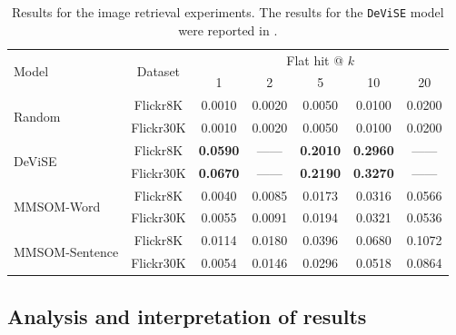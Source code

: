 \documentclass[a4paper]{standalone}
\begin{document}
\begin{table}[h]
    \begin{footnotesize}
        \begin{tabularx}{\textwidth}{|X|c|c|c|c|c|c|}
            \hline
            \multirow{2}{*}{Model}          & \multirow{2}{*}{Dataset} & \multicolumn{5}{c|}{Flat hit @ $k$} \\
            \cline{3-7}                     &                          & 1      & 2      & 5      & 10     & 20     \\ 
            \hline
            \multirow{2}{*}{Random}         & Flickr8K                  & 0.0010 & 0.0020 & 0.0050 & 0.0100 & 0.0200 \\ 
            \cline{2-7}                     & Flickr30K                 & 0.0010 & 0.0020 & 0.0050 & 0.0100 & 0.0200 \\ 
            \hline
            \multirow{2}{*}{DeViSE}\cite{frome2013devise}
                                            & Flickr8K                  & \textbf{0.0590} & ------ & \textbf{0.2010} & \textbf{0.2960} & ------ \\ 
            \cline{2-7}                     & Flickr30K                 & \textbf{0.0670} & ------ & \textbf{0.2190} & \textbf{0.3270} & ------ \\ 
            \hline
            \multirow{2}{*}{MMSOM-Word}     & Flickr8K                  & 0.0040 & 0.0085 & 0.0173 & 0.0316 & 0.0566 \\ 
            \cline{2-7}                     & Flickr30K                 & 0.0055 & 0.0091 & 0.0194 & 0.0321 & 0.0536 \\ 
            \hline
            \multirow{2}{*}{MMSOM-Sentence} & Flickr8K                  & 0.0114 & 0.0180 & 0.0396 & 0.0680 & 0.1072 \\ 
            \cline{2-7}                     & Flickr30K                 & 0.0054 & 0.0146 & 0.0296 & 0.0518 & 0.0864 \\ 
            \hline
        \end{tabularx}
    \end{footnotesize}
    \caption{Results for the image retrieval experiments. The results for the \texttt{DeViSE} model were reported in \cite{karpathy2014deep}.}
    \label{tab:ImageRetrievalResults}
\end{table}

\subsection{Analysis and interpretation of results}\label{subsec:ImageRetrievalAnalysis}
\end{document}
